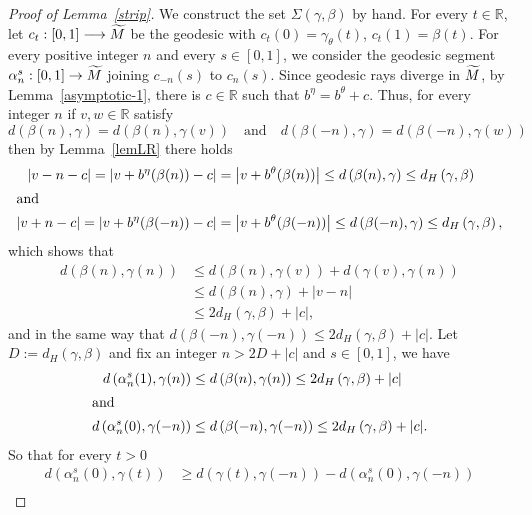 \documentclass[AHL,Unicode,longabstracts,published]{cedram}
\newcommand{\bbR}{\mathbb{R}}
\let\oldtilde\tilde
\renewcommand*{\tilde}[1]{\mathchoice{\widetilde{#1}}{\widetilde{#1}}{\oldtilde{#1}}{\oldtilde{#1}}}
\begin{document}
\begin{proof}[Proof of Lemma~\ref{strip}]
We construct the set $\Sigma(\gamma, \beta)$ by hand. For every $t\in \bbR$, let $c_{t}: [0,1] \longrightarrow \tilde{M}$ be the geodesic with $c_{t}(0)= \gamma_{\theta}(t)$, $c_{t}(1) = \beta(t)$. For every positive integer $n$ and every $s\in [0,1]$, we consider the geodesic segment $\alpha_n^s : [0,1] \rightarrow \tilde{M}$ joining $c_{-n}(s)$ to $c_{n}(s)$. Since geodesic rays diverge in $\tilde{M}$, by Lemma~\ref{asymptotic-1}, there is $c\in \bbR$ such that $b^{\eta}=b^{\theta}+c$. Thus, for every integer $n$ if $v, w \in \bbR$ satisfy
\[
d \left(\beta(n),\gamma\right) = d \left(\beta(n),\gamma(v) \right) \quad \mbox{and} \quad d \left(\beta(-n),\gamma\right) = d \left(\beta(-n),\gamma(w) \right)
\]
then by Lemma~\ref{lemLR} there holds
\begin{align*}
\left| v-n-c\right| = \left|v+b^{\eta}(\beta(n)) -c \right| &= \left|v+b^{\theta}(\beta(n))\right| \leq d \left(\beta(n),\gamma\right) \leq d_{H} \left(\gamma,\beta\right)
\\
\intertext{and}
\left| v+n-c\right| = \left|v+b^{\eta}(\beta(-n)) -c \right| &= \left|v+b^{\theta}(\beta(-n))\right| \leq d \left(\beta(-n),\gamma\right) \leq d_{H} \left(\gamma,\beta\right),
\end{align*}
which shows that
\begin{align*}
d\left(\beta(n),\gamma(n)\right) & \leq d\left(\beta(n),\gamma(v)\right) + d\left(\gamma(v),\gamma(n)\right)\\
& \leq d\left(\beta(n),\gamma\right) + |v-n| \\
& \leq 2 d_{H} \left(\gamma,\beta\right) + |c|,
\end{align*}
and in the same way that $d\left(\beta(-n),\gamma(-n)\right) \leq 2 d_{H} \left(\gamma,\beta\right) + |c|$. Let $D:=d_H(\gamma,\beta)$ and fix an integer $n>2D+|c|$ and $s\in [0,1]$, we have
\begin{align*}
d\left(\alpha_n^s(1),\gamma(n)\right) &\leq d\left(\beta(n),\gamma(n)\right) \leq 2 d_{H} \left(\gamma,\beta\right) + |c|
\\
\intertext{and}
d\left(\alpha_n^s(0),\gamma(-n)\right) &\leq d\left(\beta(-n),\gamma(-n)\right) \leq 2 d_{H} \left(\gamma,\beta\right) + |c|.
\end{align*}
So that for every $t>0$
\begin{align*}
d\left(\alpha_n^s(0),\gamma(t)\right) & \geq d\left(\gamma(t),\gamma(-n)\right)-d\left(\alpha_n^s(0),\gamma(-n)\right) \\

\end{align*}
\end{proof}
\end{document}
